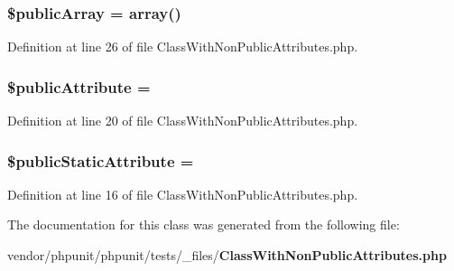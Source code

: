 \subsubsection[{\$public\+Array}]{\setlength{\rightskip}{0pt plus 5cm}\$public\+Array = array(\textquotesingle{})}\label{class_class_with_non_public_attributes_af4d62da66e82cc12f440753dc7009d0b}


Definition at line 26 of file Class\+With\+Non\+Public\+Attributes.\+php.

\subsubsection[{\$public\+Attribute}]{\setlength{\rightskip}{0pt plus 5cm}\$public\+Attribute = \textquotesingle{}}\label{class_class_with_non_public_attributes_a30ee2d115e202a1577162ee4a2e91cb4}


Definition at line 20 of file Class\+With\+Non\+Public\+Attributes.\+php.

\subsubsection[{\$public\+Static\+Attribute}]{\setlength{\rightskip}{0pt plus 5cm}\$public\+Static\+Attribute = \textquotesingle{}\hspace{0.3cm}{\ttfamily [static]}}\label{class_class_with_non_public_attributes_ae4fa27a420b4efd5bcbf3eb15b149866}


Definition at line 16 of file Class\+With\+Non\+Public\+Attributes.\+php.



The documentation for this class was generated from the following file\+:\begin{DoxyCompactItemize}
\item 
vendor/phpunit/phpunit/tests/\+\_\+files/{\bf Class\+With\+Non\+Public\+Attributes.\+php}\end{DoxyCompactItemize}
